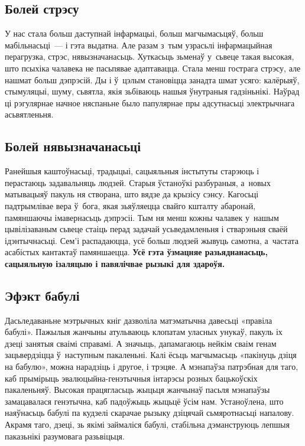 \subsection*{Болей стрэсу}

У нас стала больш даступнай інфармацыі, больш магчымасьцяў, больш мабільнасьці~--- і гэта выдатна. Але разам з~тым узрасьлі інфармацыйная перагрузка, стрэс, нявызначанасьць. Хуткасьць зьменаў у~сьвеце такая высокая, што псыхіка чалавека не пасьпявае адаптавацца. Стала менш гострага стрэсу, але нашмат больш дэпрэсій. Ды і ў~цэлым становіцца занадта шмат усяго: калёрыяў, стымуляцыі, шуму, сьвятла, якія зьбіваюць нашыя ўнутраныя гадзіньнікі. Наўрад ці рэгулярнае начное няспаньне было папулярнае пры адсутнасьці электрычнага асьвятленьня.

\subsection*{Болей нявызначанасьці}

Ранейшыя каштоўнасьці, традыцыі, сацыяльныя інстытуты старэюць і перастаюць задавальняць людзей. Старыя ўстаноўкі разбураныя, а~новых матывацыяў пакуль ня створана, што вядзе да крызісу сэнсу. Кагосьці падтрымлівае вера ў~бога, якая зьяўляецца свайго кшталту абаронай, памяншаючы імавернасьць дэпрэсіі. Тым ня менш кожны чалавек у~нашым цывілізаваным сьвеце стаіць перад задачай усьведамленьня і стварэньня сваёй ідэнтычнасьці. Сем'і распадаюцца, усё больш людзей жывуць самотна, а~частата асабістых кантактаў памяншаецца. \textbf{Усё гэта ўзмацняе разьяднанасьць, сацыяльную ізаляцыю і павялічвае рызыкі для здароўя.}

\subsection*{Эфэкт бабулі}

Дасьледаваньне мэтрычных кніг дазволіла матэматычна давесьці «правіла бабулі». Пажылыя жанчыны атульваюць клопатам уласных унукаў, пакуль іх дзеці занятыя сваімі справамі. А значыць, дапамагаюць нейкім сваім генам зацьвердзіцца ў~наступным пакаленьні. Калі ёсьць магчымасьць «пакінуць дзіця на бабулю», можна нарадзіць і другое, і трэцяе. А мэнапаўза патрэбная для таго, каб прымірыць эвалюцыйна-генэтычныя інтарэсы розных бацькоўскіх пакаленьняў. Высокая працягласьць жыцьця жанчынаў пасьля мэнапаўзы замацавалася генэтычна, каб падоўжыць жыцьцё ўсім нам. Устаноўлена, што наяўнасьць бабулі па кудзелі скарачае рызыку дзіцячай сьмяротнасьці напалову. Акрамя таго, дзеці, зь якімі займаліся бабулі, стабільна дэманструюць лепшыя паказьнікі разумовага разьвіцьця.

